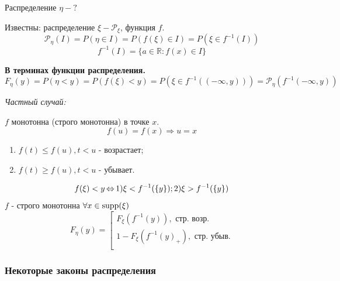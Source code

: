 Распределение $\eta - ?$

Известны: распределение $\xi - \mathcal{P}_{\xi}$, функция $f$.
\[ \mathcal{P}_{\eta} (I) = P(\eta \in I) = P(f(\xi) \in I) = P(\xi \in f^{-1} (I)) \]
\[ f^{-1} (I) = \{ a \in \mathbb{R} : f(x) \in I \} \]

\textbf{В терминах функции распределения.}
\[ F_{\eta} (y) = P(\eta < y) = P(f(\xi) < y) = P(\xi \in f^{-1} ((- \infty, y))) = \mathcal{P}_{\eta} (f^{-1}(- \infty, y)) \]

\textit{Частный случай:}

\noindent $f$ монотонна (строго монотонна) в точке $x$.
\[ 	f(u) = f(x) \Rightarrow u = x \]
\begin{enumerate}
	\item $f(t) \le f(u), t < u$ - возрастает;
	\item $f(t) \ge f(u), t < u$ - убывает.
\end{enumerate}
\[ f(\xi) < y \operatorname{\Leftrightarrow} 1) \xi < f^{-1} (\{y\}); 2) \xi > f^{-1} (\{y\}) \]
$f$ - строго монотонна $\forall x \in \operatorname{supp} (\xi)$
\[
F_{\eta} (y) =
\left[
	\begin{array}{c}
		F_{\xi} (f^{-1}(y)), \text{ стр. возр.} \\
		1 - F_{\xi} (f^{-1} (y)_{+}), \text{ стр. убыв.} \\
	\end{array}
\right.
\]

\subsubsection{Некоторые законы распределения}

